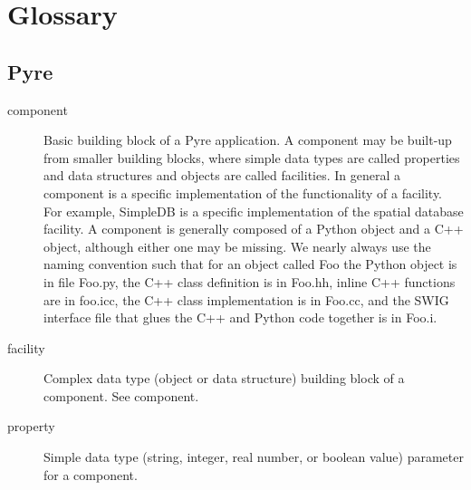 
\chapter{\label{cha:Glossary}Glossary}


\section{Pyre}
\begin{description}
\item [{component}] Basic building block of a Pyre application. A component
may be built-up from smaller building blocks, where simple data types
are called properties and data structures and objects are called facilities.
In general a component is a specific implementation of the functionality
of a facility. For example, SimpleDB is a specific implementation
of the spatial database facility. A component is generally composed
of a Python object and a C++ object, although either one may be missing.
We nearly always use the naming convention such that for an object
called Foo the Python object is in file Foo.py, the C++ class definition
is in Foo.hh, inline C++ functions are in foo.icc, the C++ class implementation
is in Foo.cc, and the SWIG interface file that glues the C++ and Python
code together is in Foo.i.
\item [{facility}] Complex data type (object or data structure) building
block of a component. See component.
\item [{property}] Simple data type (string, integer, real number, or boolean
value) parameter for a component.
\end{description}

